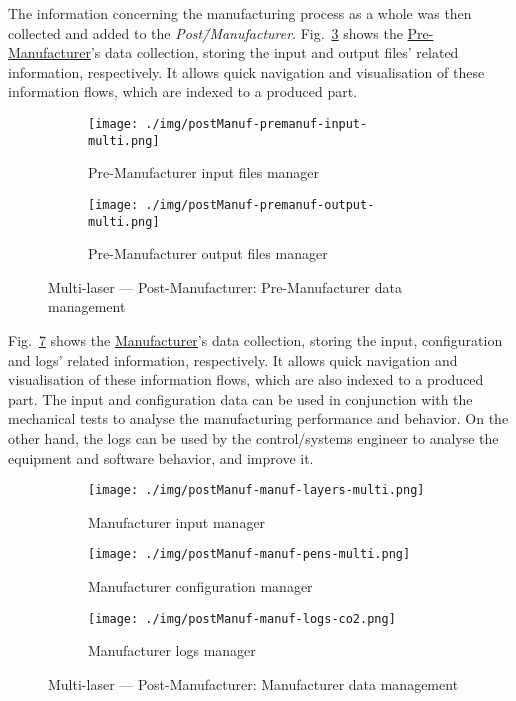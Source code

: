 The information concerning the manufacturing process as a whole was then
collected and added to the \emph{Post\=/Manufacturer}.
Fig.~\ref{fig:postManuf-premanuf-multi} shows the \underline{Pre-Manufacturer}'s data
collection, storing the input and output files' related information,
respectively. It allows quick navigation and visualisation of these information
flows, which are indexed to a produced part.

\begin{figure}[htb!]
  \centering
  \begin{subfigure}[t]{.8\textwidth}
    \texttt{[image: ./img/postManuf-premanuf-input-multi.png]}%
  \caption{Pre-Manufacturer input files manager}%
  \label{fig:postManuf-premanuf-input-multi}
  \end{subfigure}
%
  \begin{subfigure}[t]{.8\textwidth}
    \texttt{[image: ./img/postManuf-premanuf-output-multi.png]}%
  \caption{Pre-Manufacturer output files manager}%
  \label{fig:postManuf-premanuf-output-multi}
\end{subfigure}
%
  \caption{Multi-laser --- Post-Manufacturer: Pre-Manufacturer
    data management}%
  \label{fig:postManuf-premanuf-multi}
\end{figure}

Fig.~\ref{fig:postManuf-manuf-multi} shows the \underline{Manufacturer}'s data
collection, storing the input, configuration and logs' related information,
respectively. It allows quick navigation and visualisation of these information
flows, which are also indexed to a produced part. The input and configuration
data can be used in conjunction with the mechanical tests to analyse the
manufacturing performance and behavior. On the other hand, the logs can be used
by the control/systems engineer to analyse the equipment and software behavior,
and improve it.

\begin{figure}[htb!]
  \centering
  \begin{subfigure}[t]{.6\textwidth}
    \texttt{[image: ./img/postManuf-manuf-layers-multi.png]}%
  \caption{Manufacturer input manager}%
  \label{fig:postManuf-manuf-layers-multi}
  \end{subfigure}
%
  \begin{subfigure}[t]{.6\textwidth}
    \texttt{[image: ./img/postManuf-manuf-pens-multi.png]}%
  \caption{Manufacturer configuration manager}%
  \label{fig:postManuf-manuf-pens-multi}
\end{subfigure}
%
  \begin{subfigure}[t]{.6\textwidth}
    \texttt{[image: ./img/postManuf-manuf-logs-co2.png]}%
  \caption{Manufacturer logs manager}%
  \label{fig:postManuf-manuf-logs-multi}
\end{subfigure}
%
  \caption{Multi-laser --- Post-Manufacturer: Manufacturer
    data management}%
  \label{fig:postManuf-manuf-multi}
\end{figure}

